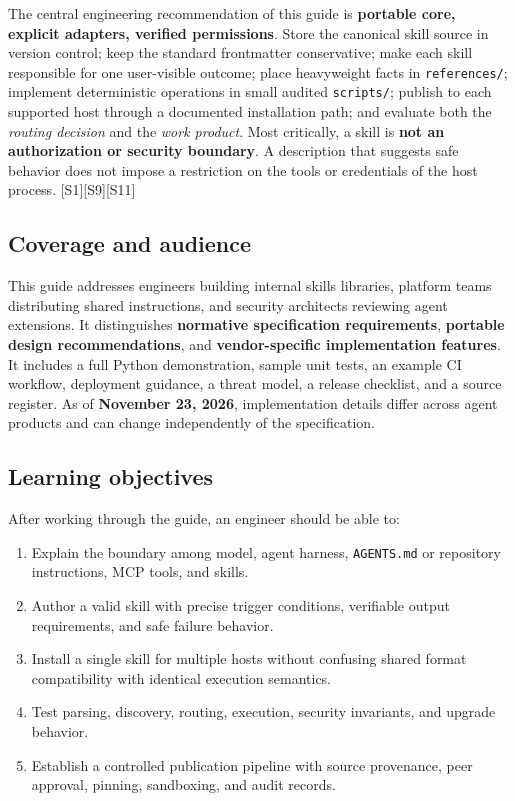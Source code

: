\documentclass[
  10pt,
  letterpaper,
]{article}
\newcommand{\passthrough}[1]{#1}
\providecommand{\tightlist}{%
  \setlength{\itemsep}{0pt}\setlength{\parskip}{0pt}}
\begin{document}
The central engineering recommendation of this guide is \textbf{portable
core, explicit adapters, verified permissions}. Store the canonical
skill source in version control; keep the standard frontmatter
conservative; make each skill responsible for one user-visible outcome;
place heavyweight facts in \passthrough{\lstinline!references/!};
implement deterministic operations in small audited
\passthrough{\lstinline!scripts/!}; publish to each supported host
through a documented installation path; and evaluate both the
\emph{routing decision} and the \emph{work product}. Most critically, a
skill is \textbf{not an authorization or security boundary}. A
description that suggests safe behavior does not impose a restriction on
the tools or credentials of the host process. {[}S1{]}{[}S9{]}{[}S11{]}

\subsection{Coverage and audience}\label{coverage-and-audience}

This guide addresses engineers building internal skills libraries,
platform teams distributing shared instructions, and security architects
reviewing agent extensions. It distinguishes \textbf{normative
specification requirements}, \textbf{portable design recommendations},
and \textbf{vendor-specific implementation features}. It includes a full
Python demonstration, sample unit tests, an example CI workflow,
deployment guidance, a threat model, a release checklist, and a source
register. As of \textbf{November 23, 2026}, implementation details
differ across agent products and can change independently of the
specification.

\subsection{Learning objectives}\label{learning-objectives}

After working through the guide, an engineer should be able to:

\begin{enumerate}
\def\labelenumi{\arabic{enumi}.}
\tightlist
\item
  Explain the boundary among model, agent harness,
  \passthrough{\lstinline!AGENTS.md!} or repository instructions, MCP
  tools, and skills.
\item
  Author a valid skill with precise trigger conditions, verifiable
  output requirements, and safe failure behavior.
\item
  Install a single skill for multiple hosts without confusing shared
  format compatibility with identical execution semantics.
\item
  Test parsing, discovery, routing, execution, security invariants, and
  upgrade behavior.
\item
  Establish a controlled publication pipeline with source provenance,
  peer approval, pinning, sandboxing, and audit records.
\end{enumerate}
\end{document}
